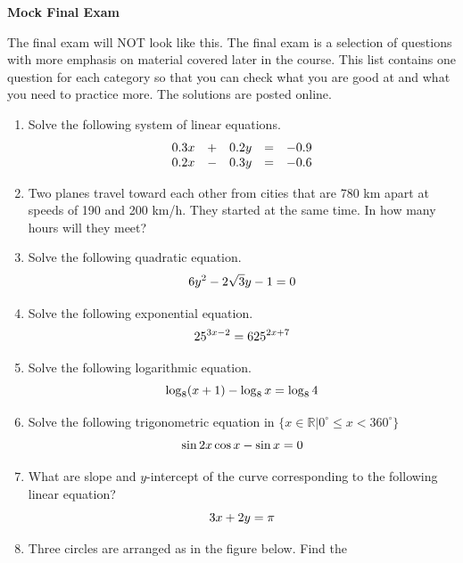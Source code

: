 \documentclass[11pt]{article}
\begin{document}
\textbf{Mock Final Exam}

The final exam will NOT look like this. The final exam is a selection
of questions with more emphasis on material covered later in the
course. This list contains one question for each category so that you
can check what you are good at and what you need to practice more. The
solutions are posted online.

\begin{enumerate}
\item Solve the following system of linear equations.
  \begin{equation}
    \label{eq:oedeoyai}
    \begin{array}{lclcr}
      0.3x & + & 0.2y & = & -0.9 \\
      0.2x & - & 0.3y & = & -0.6
    \end{array}\notag
  \end{equation}
\item Two planes travel toward each other from cities that are 780 km
  apart at speeds of 190 and 200 km/h. They started at the same time.
  In how many hours will they meet?
\item Solve the following quadratic equation.
  \begin{equation}
    \label{eq:eishahji}
    6y^{2}-2\sqrt{3}y-1=0\notag
  \end{equation}
\item Solve the following exponential equation.
  \begin{equation}
    \label{eq:vohtovuj}
    25^{3x-2}=625^{2x+7}\notag
  \end{equation}
\item Solve the following logarithmic equation.
  \begin{equation}
    \label{eq:laishedu}
    \log_{8}(x+1)-\log_{8}x=\log_{8}4\notag
  \end{equation}
\item Solve the following trigonometric equation in $\{x\in\mathbb{R}|0^{\circ}\leq{}x<360^{\circ}\}$
  \begin{equation}
    \label{eq:iegheovi}
    \sin{}2x\cos{}x-\sin{}x=0\notag
  \end{equation}
\item What are slope and $y$-intercept of the curve corresponding to
  the following linear equation?
  \begin{equation}
    \label{eq:eopifeek}
    3x+2y=\pi\notag
  \end{equation}
  \newpage
\item Three circles are arranged as in the figure below. Find the

\end{enumerate}
\end{document}
